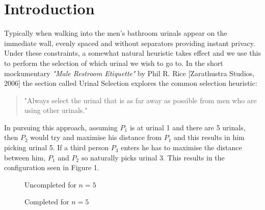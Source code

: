 \documentclass{article}
\begin{document}
\section{Introduction}
Typically when walking into the men's bathroom urinals appear on the immediate wall, evenly spaced and without separators providing instant privacy. Under these constraints, a somewhat natural heuristic takes effect and we use this to perform the selection of which urinal we wish to go to. In the short mockumentary \textit{"Male Restroom Etiquette"} by Phil R. Rice  [Zarathustra Studios, 2006] the section called Urinal Selection explores the common selection heuristic: 
\begin{quote}
    "Always select the urinal that is as far away as possible from men who are using other urinals."
\end{quote}
In pursuing this approach, assuming $P_{1}$ is at urinal 1 and there are 5 urinals, then $P_{2}$ would try and maximise his distance from $P_{1}$ and this results in him picking urinal 5. If a third person $P_{3}$ enters he has to maximise the distance between him, $P_{1}$ and $P_{2}$ so naturally picks urinal 3. This results in the configuration seen in Figure 1.
\begin{figure}[h]
\centering
\caption{Uncompleted for $n=5$} \label{fig:M1}
\end{figure}
\begin{figure}[h]
\centering
\caption{Completed for $n=5$} \label{fig:M2}
\end{figure}
\end{document}
